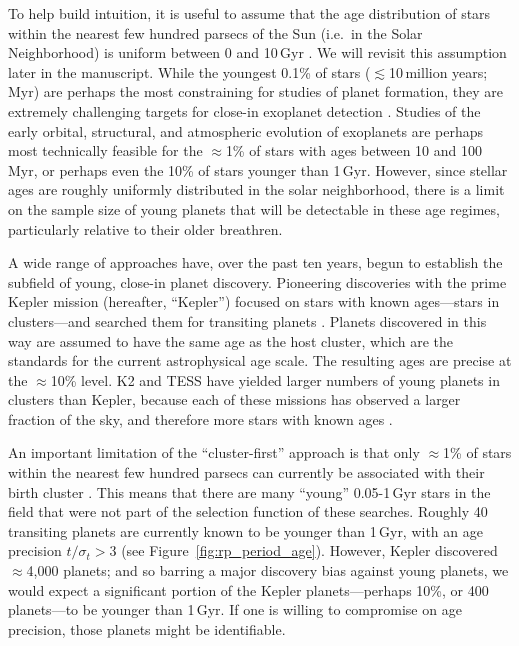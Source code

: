 \documentclass[12pt,twocolumn,tighten]{aastex63}
\begin{document}
To help build intuition, it is useful to assume that the age
distribution of stars within the nearest few hundred parsecs of the
Sun (i.e.~in the Solar Neighborhood) is uniform between 0 and 10\,Gyr
\citep{Nordstrom_2004}.  We will revisit this assumption later in the
manuscript.  While the youngest 0.1\% of stars ($\lesssim$10\,million
years; Myr) are perhaps the most constraining for studies of planet
formation, they are extremely challenging targets for close-in
exoplanet detection 
\citep[see e.g.][]{Damasso_2020,Bouma_2020_ptfo,Donati_2020}.  Studies of
the early orbital, structural, and atmospheric evolution of exoplanets
are perhaps most technically feasible for the $\approx$1\% of stars
with ages between 10 and 100\,Myr, or perhaps even the 10\% of stars
younger than 1\,Gyr.  However, since stellar ages are roughly
uniformly distributed in the solar neighborhood, there is a limit on
the sample size of young planets that will be detectable in these age
regimes, particularly relative to their older breathren.

A wide range of approaches have, over the past ten years, begun to
establish the subfield of young, close-in planet discovery.
Pioneering discoveries with the prime Kepler mission (hereafter,
``Kepler'') focused on stars with known ages---stars in clusters---and
searched them for transiting planets \citep{Meibom_2013}.  Planets
discovered in this way are assumed to have the same age as the host
cluster, which are the standards for the current astrophysical age
scale.  The resulting ages are precise at the $\approx$10\% level.  K2
and TESS have yielded larger numbers of young planets in clusters than
Kepler, because each of these missions has observed a larger fraction
of the sky, and therefore more stars with known ages
\citep[e.g.][]{Mann_K2_25_2016,Mann_2017,Curtis_2018,Livingston_2018,David_2019,Bouma_2020_toi837,Rizzuto_2020,Plavchan_2020,Newton_2021,Nardiello_2022,Tofflemire_2021,Zhou_2022,Zakhozhay_2022,Wood_2023}.

An important limitation of the ``cluster-first'' approach is that only
$\approx$1\% of stars within the nearest few hundred parsecs can
currently be associated with their birth cluster
\citep[e.g.][]{Zari_2018,CantatGaudin_2020,Kounkel_2020,Kerr_2021}.
This means that there are many ``young'' 0.05-1\,Gyr stars in the
field that were not part of the selection function of these searches.
Roughly 40 transiting planets are currently known to be younger than
1\,Gyr, with an age precision $t/\sigma_t > 3$ (see
Figure~\ref{fig:rp_period_age}).  However, Kepler discovered
$\approx$4{,}000 planets; and so barring a major discovery bias
against young planets, we would expect a significant portion of the
Kepler planets---perhaps 10\%, or 400 planets---to be younger than
1\,Gyr.  If one is willing to compromise on age precision, those
planets might be identifiable.
\end{document}
